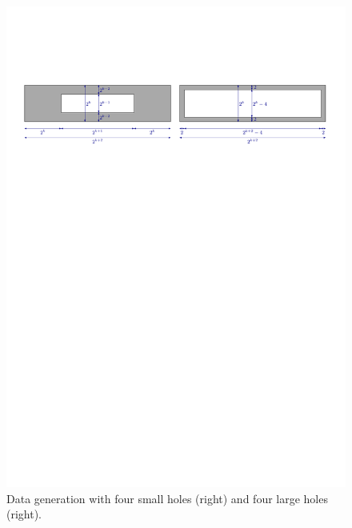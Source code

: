\documentclass[a4paper,11pt]{article}
\begin{document}
\begin{figure}
	\includegraphics[width=\textwidth,page=2]{data_generation}
	\caption{Data generation with four small holes (right) and four large holes (right).}
	\label{fig:data_generation2}
\end{figure}


\end{document}

